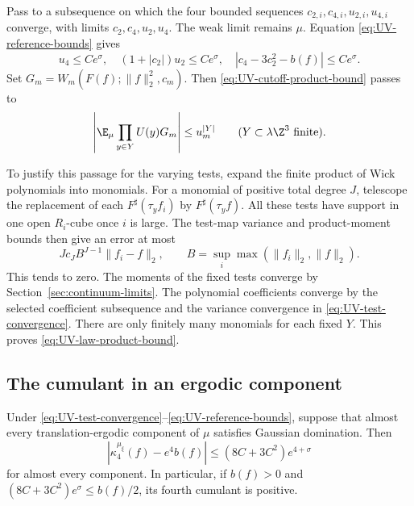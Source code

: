 Pass to a subsequence on which the four bounded sequences
$c_{2,i},c_{4,i},u_{2,i},u_{4,i}$ converge, with limits
$c_2,c_4,u_2,u_4$. The weak limit remains $\mu$.
Equation \eqref{eq:UV-reference-bounds} gives
\begin{equation}\label{eq:UV-reference-limit}
 u_4\le Ce^\sigma,\quad
 (1+|c_2|)u_2\le Ce^\sigma,\quad
 |c_4-3c_2^2-b(f)|\le Ce^\sigma.
\end{equation}
Set $G_m=W_m(F(f);\|f\|_2^2,c_m)$.
Then \eqref{eq:UV-cutoff-product-bound} passes to
\begin{equation}\label{eq:UV-law-product-bound}
 \left|\E_\mu\prod_{y\in Y}U(y)G_m\right|\le u_m^{|Y|}
                   \qquad(Y\subset\lambda\Z^3\text{ finite}).
\end{equation}

To justify this passage for the varying tests, expand the finite
product of Wick polynomials into monomials. For a monomial
of positive total degree $J$, telescope the replacement of each
$F^\sharp(\tau_y f_i)$ by $F^\sharp(\tau_y f)$.
All these tests have support in one open $R_i$-cube once $i$
is large. The test-map variance and product-moment bounds
then give an error at most
\[
 Jc_J B^{J-1}\|f_i-f\|_2,
 \qquad B=\sup_i\max(\|f_i\|_2,\|f\|_2).
\]
This tends to zero. The moments of the fixed tests converge
by Section~\ref{sec:continuum-limits}. The polynomial coefficients
converge by the selected coefficient subsequence and the
variance convergence in \eqref{eq:UV-test-convergence}.
There are only finitely many monomials for each fixed $Y$.
This proves \eqref{eq:UV-law-product-bound}.

\subsection{The cumulant in an ergodic component}

\begin{proposition}\label{prop:UV-component-cumulant}
Under \eqref{eq:UV-test-convergence}--\eqref{eq:UV-reference-bounds},
suppose that almost every translation-ergodic component of $\mu$
satisfies Gaussian domination. Then
\begin{equation}\label{eq:UV-component-cumulant}
 \left|\kappa_4^{\mu_\xi}(f)-e^4b(f)\right|
                 \le(8C+3C^2)e^{4+\sigma}
\end{equation}
for almost every component. In particular, if $b(f)>0$ and
$(8C+3C^2)e^\sigma\le b(f)/2$, its fourth cumulant is positive.
\end{proposition}


